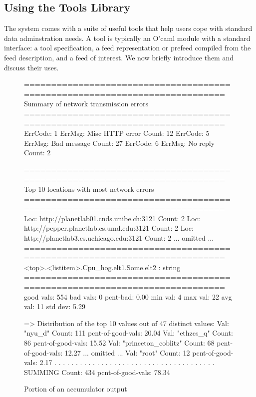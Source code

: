 \subsection{Using the Tools Library}
\label{sec:tools}
The \padsd{} system comes with a suite of useful tools that help users 
cope with standard data adminstration needs. A tool is typically an
O'caml module with a standard interface: a tool specification, a
feed representation or prefeed compiled from the feed description,
and a feed of interest. We now briefly introduce them and discuss their uses. 

\begin{figure*}[th]
\centering
\begin{codebox}
===========================================================================
Summary of network transmission errors
===========================================================================
ErrCode: 1      ErrMsg: Misc HTTP error Count: 12
ErrCode: 5      ErrMsg: Bad message     Count: 27
ErrCode: 6      ErrMsg: No reply        Count: 2

===========================================================================
Top 10 locations with most network errors
===========================================================================
Loc: http://planetlab01.cnds.unibe.ch:3121    Count: 2
Loc: http://pepper.planetlab.cs.umd.edu:3121  Count: 2
Loc: http://planetlab3.cs.uchicago.edu:3121   Count: 2
... omitted ...
===========================================================================
<top>.<listitem>.Cpu_hog.elt1.Some.elt2 : string
===========================================================================
good vals:      554     bad vals:       0       pcnt-bad:       0.00%
min val: 4      max val: 22     avg val: 11     std dev: 5.29   

=> Distribution of the top 10 values out of 47 distinct values:
    Val: "nyu_d"                    Count: 111     pcnt-of-good-vals: 20.04%
    Val: "ethzcs_q"                 Count: 86      pcnt-of-good-vals: 15.52%
    Val: "princeton_coblitz"        Count: 68      pcnt-of-good-vals: 12.27%
    ... omitted ...
    Val: "root"                     Count: 12      pcnt-of-good-vals: 2.17%
. . . . . . . . . . . . . . . . . . . . . . . . . . . . . . . . . . . . . .
    SUMMING                         Count: 434     pcnt-of-good-vals: 78.34%
\end{codebox}
\caption{Portion of an accumulator output} \label{fig:acc}
\end{figure*} 

